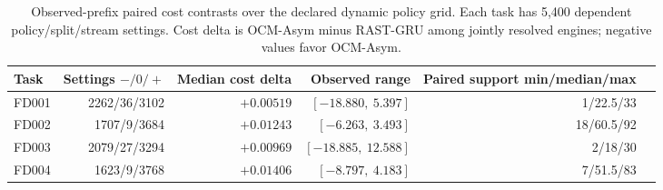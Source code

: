 \begin{table}[H]
\centering
\scriptsize
\setlength{\tabcolsep}{4pt}
\caption{Observed-prefix paired cost contrasts over the declared dynamic policy grid. Each task has 5,400 dependent policy/split/stream settings. Cost delta is OCM-Asym minus RAST-GRU among jointly resolved engines; negative values favor OCM-Asym.}
\label{tab:dynamic-policy-paired}
\begin{tabular}{@{}lrrrrr@{}}
\toprule
Task & Settings $-/0/+$ & Median cost delta & Observed range & Paired support min/median/max \\
\midrule
FD001 & 2262/36/3102 & $+0.00519$ & $[-18.880,\ 5.397]$ & 1/22.5/33 \\
FD002 & 1707/9/3684 & $+0.01243$ & $[-6.263,\ 3.493]$ & 18/60.5/92 \\
FD003 & 2079/27/3294 & $+0.00969$ & $[-18.885,\ 12.588]$ & 2/18/30 \\
FD004 & 1623/9/3768 & $+0.01406$ & $[-8.797,\ 4.183]$ & 7/51.5/83 \\
\bottomrule
\end{tabular}
\end{table}
